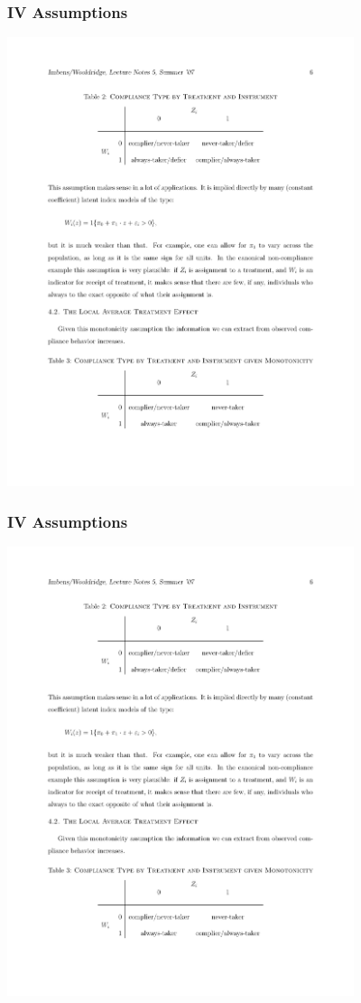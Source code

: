 \begin{frame}
\frametitle{IV Assumptions}
\includegraphics[width=4in]{./resources/imbens2.pdf}
\end{frame}

\begin{frame}
\frametitle{IV Assumptions}
\includegraphics[width=4in]{./resources/imbens3.pdf}
\end{frame}

